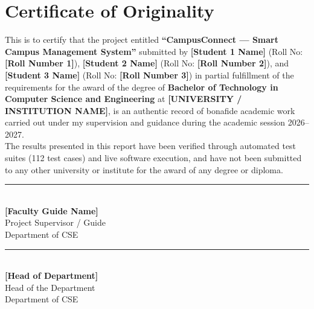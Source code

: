 \documentclass[12pt,a4paper,oneside]{report}
\begin{document}
\newpage
\chapter*{Certificate of Originality}
This is to certify that the project entitled \textbf{``CampusConnect --- Smart Campus Management System''} submitted by \textbf{[Student 1 Name]} (Roll No: \textbf{[Roll Number 1]}), \textbf{[Student 2 Name]} (Roll No: \textbf{[Roll Number 2]}), and \textbf{[Student 3 Name]} (Roll No: \textbf{[Roll Number 3]}) in partial fulfillment of the requirements for the award of the degree of \textbf{Bachelor of Technology in Computer Science and Engineering} at \textbf{[UNIVERSITY / INSTITUTION NAME]}, is an authentic record of bonafide academic work carried out under my supervision and guidance during the academic session 2026--2027.\\[0.5cm]
The results presented in this report have been verified through automated test suites (112 test cases) and live software execution, and have not been submitted to any other university or institute for the award of any degree or diploma.\\[2.0cm]

\noindent
\begin{minipage}{0.48\textwidth}
    \rule{6cm}{0.4pt}\\
    \textbf{[Faculty Guide Name]}\\
    Project Supervisor / Guide\\
    Department of CSE\\
    [University / Institution Name]
\end{minipage}
\hfill
\begin{minipage}{0.48\textwidth}
    \flushright
    \rule{6cm}{0.4pt}\\
    \textbf{[Head of Department]}\\
    Head of the Department\\
    Department of CSE\\
    [University / Institution Name]
\end{minipage}

\newpage
\end{document}
